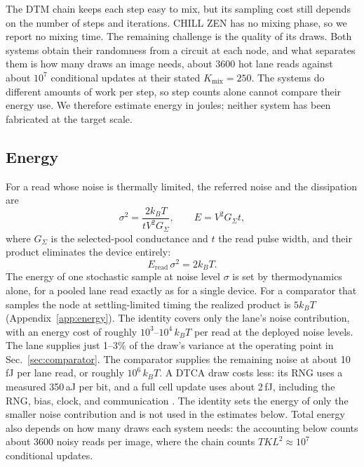 \documentclass[reprint,amsmath,amssymb,aps,nofootinbib]{revtex4-2}
\newcommand{\kB}{k_{B}}
\begin{document}
The DTM chain keeps each step easy to mix, but its sampling cost still
depends on the number of steps and iterations. CHILL ZEN has no mixing
phase, so we report no mixing time. The remaining challenge is the
quality of its draws. Both systems obtain their randomness
from a circuit at each node, and what separates them is how many draws
an image needs, about 3600 hot lane reads against about $10^{7}$
conditional updates at their stated $K_{\mathrm{mix}} = 250$. The systems do different amounts of work per step, so step counts alone
cannot compare their energy use. We therefore estimate energy in joules;
neither system has been fabricated at the target scale.

\subsection{Energy}\label{sec:energy}

For a read whose noise is thermally limited, the referred noise and
the dissipation are
\begin{equation}
\sigma^2 = \frac{2 \kB T}{t V^2 G_\Sigma}, \qquad
E = V^2 G_\Sigma t,
\end{equation}
where $G_\Sigma$ is the selected-pool conductance and $t$ the read
pulse width, and their product eliminates the device entirely:
\begin{equation}
E_{\mathrm{read}} \, \sigma^2 = 2 \kB T .
\label{eq:ethermal}
\end{equation}
The energy of one stochastic sample at noise level $\sigma$ is set by
thermodynamics alone, for a pooled lane read exactly as for a single
device. For a comparator that samples the node at settling-limited
timing the realized product is $5 \kB T$ (Appendix~\ref{app:energy}).
The identity covers only the lane's noise contribution, with an energy
cost of roughly $10^3$--$10^4\,\kB T$ per read at the deployed noise
levels. The lane supplies just 1--3\% of the draw's variance at the
operating point in Sec.~\ref{sec:comparator}. The comparator supplies the remaining noise at about 10\,fJ per lane
read, or roughly $10^6\,\kB T$. A DTCA draw costs less: its RNG uses a
measured 350\,aJ per bit, and a full cell update uses about 2\,fJ,
including the RNG, bias, clock, and communication
\cite{jelincic2025dtm}. The identity sets the energy of only the smaller noise contribution and
is not used in the estimates below. Total energy also depends on how
many draws each system needs: the accounting below counts about 3600
noisy reads per image, where the chain counts $T K L^2 \approx 10^{7}$
conditional updates.
\end{document}
